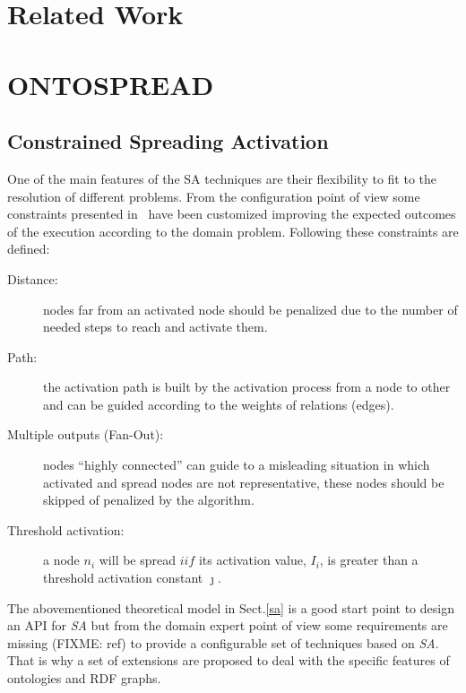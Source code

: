 \documentclass{llncs}
\begin{document}
\section{Related Work}
\section{ONTOSPREAD}
\subsection{Constrained Spreading Activation}
One of the main features of the SA techniques are their flexibility to fit to 
the resolution of different problems. From the configuration point of view
some constraints presented in~\cite{Cohen1987} have been customized improving
the expected outcomes of the execution according to the domain problem. Following these
constraints are defined:

\begin{description}

\item [Distance:] nodes far from an activated node should be penalized due to
the number of needed steps to reach and activate them.

\item [Path:] the activation path is built by the activation process from a node
to other and can be guided according to the weights of relations (edges). 

\item [Multiple outputs (Fan-Out):] nodes ``highly connected'' can 
guide to a misleading situation in which activated and spread nodes are not representative, these nodes
should be skipped of penalized by the algorithm.


\item [Threshold activation:] a node $n_i$ will be spread $iif$ its activation
value, $I_i$, is greater than a threshold activation constant $\jmath$.

\end{description}

The abovementioned theoretical model in Sect.\ref{sa} is a good start point to design
an API for \textit{SA} but from the domain expert point of view some requirements are missing (FIXME: ref) to provide
a configurable set of techniques based on \textit{SA}. That is why a set of extensions are proposed to deal
with the specific features of ontologies and RDF graphs.
\end{document}
